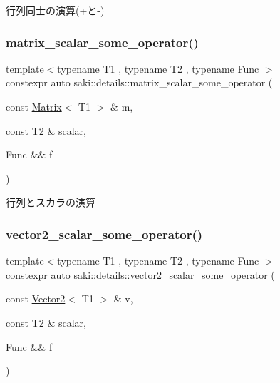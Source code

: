 行列同士の演算(+と-\/) 

\mbox{\label{namespacesaki_1_1details_a3b467138701d036240cfbf728d3a7a2d}} 
\subsubsection{\texorpdfstring{matrix\+\_\+scalar\+\_\+some\+\_\+operator()}{matrix\_scalar\_some\_operator()}}
{\footnotesize\ttfamily template$<$typename T1 , typename T2 , typename Func $>$ \\
constexpr auto saki\+::details\+::matrix\+\_\+scalar\+\_\+some\+\_\+operator (\begin{DoxyParamCaption}\item[{const \mbox{\hyperlink{classsaki_1_1_matrix}{Matrix}}$<$ T1 $>$ \&}]{m,  }\item[{const T2 \&}]{scalar,  }\item[{Func \&\&}]{f }\end{DoxyParamCaption})}



行列とスカラの演算 

\mbox{\label{namespacesaki_1_1details_a8767a64d897787a3b0561939412abb28}} 
\subsubsection{\texorpdfstring{vector2\+\_\+scalar\+\_\+some\+\_\+operator()}{vector2\_scalar\_some\_operator()}}
{\footnotesize\ttfamily template$<$typename T1 , typename T2 , typename Func $>$ \\
constexpr auto saki\+::details\+::vector2\+\_\+scalar\+\_\+some\+\_\+operator (\begin{DoxyParamCaption}\item[{const \mbox{\hyperlink{classsaki_1_1_vector2}{Vector2}}$<$ T1 $>$ \&}]{v,  }\item[{const T2 \&}]{scalar,  }\item[{Func \&\&}]{f }\end{DoxyParamCaption})}



